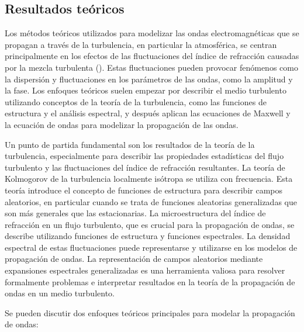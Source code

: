 \subsection{Resultados teóricos}\label{sec:resultados_teoricos}

Los métodos teóricos utilizados para modelizar las ondas electromagnéticas que se propagan a través de la turbulencia, en particular la atmosférica, se centran principalmente en los efectos de las fluctuaciones del índice de refracción causadas por la mezcla turbulenta (\cite{tatarski_wave_1967}). Estas fluctuaciones pueden provocar fenómenos como la dispersión y fluctuaciones en los parámetros de las ondas, como la amplitud y la fase. Los enfoques teóricos suelen empezar por describir el medio turbulento utilizando conceptos de la teoría de la turbulencia, como las funciones de estructura y el análisis espectral, y después aplican las ecuaciones de Maxwell y la ecuación de ondas para modelizar la propagación de las ondas.

Un punto de partida fundamental son los resultados de la teoría de la turbulencia, especialmente para describir las propiedades estadísticas del flujo turbulento y las fluctuaciones del índice de refracción resultantes. La teoría de Kolmogorov de la turbulencia localmente isótropa se utiliza con frecuencia. Esta teoría introduce el concepto de funciones de estructura para describir campos aleatorios, en particular cuando se trata de funciones aleatorias generalizadas que son más generales que las estacionarias. La microestructura del índice de refracción en un flujo turbulento, que es crucial para la propagación de ondas, se describe utilizando funciones de estructura y funciones espectrales. La densidad espectral de estas fluctuaciones puede representarse y utilizarse en los modelos de propagación de ondas. La representación de campos aleatorios mediante expansiones espectrales generalizadas es una herramienta valiosa para resolver formalmente problemas e interpretar resultados en la teoría de la propagación de ondas en un medio turbulento.

Se pueden discutir dos enfoques teóricos principales para modelar la propagación de ondas:

